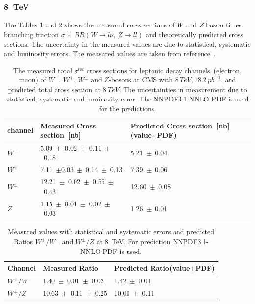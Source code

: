 \subsubsection{8~TeV}
The Tables \ref{8tev_tab} and \ref{8tev_tab1} shows the measured cross sections of $W$ and $Z$ boson times branching fraction $\sigma\times~BR(W\rightarrow l\nu,~Z\rightarrow ll)$ and theoretically predicted cross sections. The uncertainty in the measured values are due to statistical, systematic and luminosity errors. The measured values are taken from reference~\cite{Chatrchyan_2014}. 
\begin{table}[H]
\caption{The measured total $\sigma^{tot}$ cross sections for leptonic decay channels~(electron, muon) of $W^{-}$, $W^{+}$, $W^{\pm}$ and $Z$-bosons at CMS with $8~TeV, 18.2~pb^{-1}$, and predicted total cross section at $8~TeV$. The uncertainties in measurement due to statistical, systematic and luminosity error. The NNPDF3.1-NNLO PDF is used for the predictions.}
\centering
\begin{tabular}{|l|p{6cm}|p{6cm}| }
\hline
channel&\bf Measured Cross section~[nb]&\bf Predicted Cross section~[nb]\newline (value$\pm$PDF)\\
\hline
\hline
$W^{-}$&5.09~$\pm$~0.02~$\pm$~0.11~$\pm$~0.18&5.21~$\pm$~0.04\\
$W^{+}$&7.11~$\pm$0.03~$\pm$~0.14~$\pm$~0.13&7.39~$\pm$~0.06\\
$W^{\pm}$&12.21~$\pm$~0.02~$\pm$~0.55~$\pm$~0.43&12.60~$\pm$~0.08\\
\hline
\hline
$Z$&1.15~$\pm$~0.01~$\pm$~0.02~$\pm$~0.03&1.26~$\pm$~0.01\\
\hline

\end{tabular}
\label{8tev_tab}
\end{table}

\begin{table}[H]
\caption{Measured values with statistical and systematic errors and predicted Ratios $W^{+}/W^{-}$ and $W^{\pm}/Z$ at 8~TeV. For prediction NNPDF3.1-NNLO PDF is used.}
\centering
\begin{tabular}{|l|p{6cm}|p{6cm}|}
\hline
Channel&\bf Measured Ratio&\bf Predicted Ratio\newline(value$\pm$PDF)\\
\hline
\hline
$W^{+}/W^{-}$&1.40~$\pm$~0.01~$\pm$~0.02&1.42~$\pm$~0.01~\\
$W^{\pm}/Z$&10.63~$\pm$~0.11~$\pm$~0.25&10.00~$\pm$~0.11\\
\hline
\end{tabular}
\label{8tev_tab1}
\end{table}

